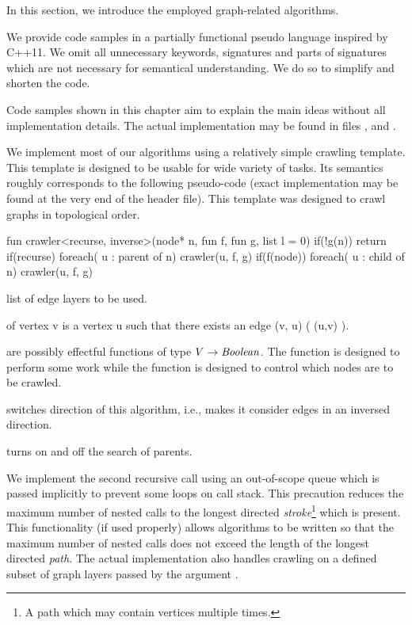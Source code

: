 
In this section, we introduce the employed graph-related algorithms. 

We provide code samples in a partially functional pseudo language inspired by C++11. We omit all unnecessary keywords, signatures and parts of signatures which are not necessary for semantical understanding. We do so to simplify and shorten the code.

Code samples shown in this chapter aim to explain the main ideas without all implementation details. The actual implementation may be found in files ,  and .

We implement most of our algorithms using a relatively simple crawling template. This template is designed to be usable for wide variety of tasks. Its semantics roughly corresponds to the following pseudo-code (exact implementation may be found at the very end of the  header file). This template was designed to crawl graphs in topological order.

\mybeginfig %
\begin{code}
fun crawler<recurse, inverse>(node* n, fun f, fun g, list l = {0})
{
  if(!g(n))
    return
  if(recurse)
    foreach( u : parent of n)
      crawler(u, f, g)
  if(f(node))
    foreach( u : child of n)
      crawler(u, f, g)
}
\end{code}

\begin{description}
  \item {} list of edge layers to be used.
  \item {} of vertex v is a vertex u such that there exists an edge (v, u) ( (u,v) ).
  \item {} are possibly effectful functions of type $V \arrow \mf{Boolean}$. The function  is designed to perform some work while the  function is designed to control which nodes are to be crawled.
  \item {} switches direction of this algorithm, i.e., makes it consider edges in an inversed direction.
  \item {} turns on and off the search of parents.
\end{description}

We implement the second recursive call using an out-of-scope queue which is passed implicitly to prevent some loops on call stack. This precaution reduces the maximum number of nested calls to the longest directed \emph{stroke}\footnote{A path which may contain vertices multiple times.} which is present. This functionality (if used properly) allows algorithms to be written so that the maximum number of nested calls does not exceed the length of the longest directed \emph{path}. The actual implementation also handles crawling on a defined subset of graph layers passed by the argument .

